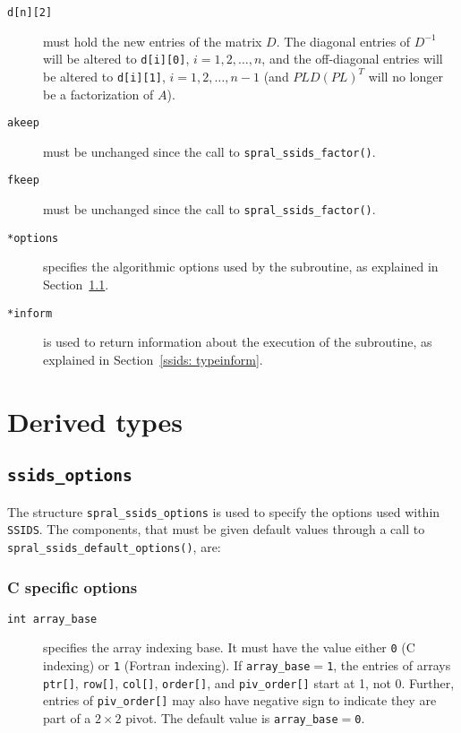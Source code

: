 \begin{description}

\item[\texttt{d[n][2]}] must hold the new entries of the matrix $D$.
   The diagonal entries of ${D}^{-1}$ will be altered to
   {\tt d[i][0]}, $i = 1,2,\ldots,n$, and the off-diagonal entries will be
   altered to {\tt d[i][1]}, $i = 1,2,\ldots,n-1$ (and $PLD(PL)^T$ will no
   longer be a factorization of $A$).

\item[\texttt{akeep}] must be unchanged since the call to
   {\tt spral\_ssids\_factor()}.

\item[\texttt{fkeep}] must be unchanged since the call to
   {\tt spral\_ssids\_factor()}.

\item[\texttt{*options}] specifies the algorithmic options used by the
   subroutine, as explained in Section~\ref{ssids: typeoptions}.

\item[\texttt{*inform}] is used to return information about the execution
   of the subroutine, as explained in Section~\ref{ssids: typeinform}.

\end{description}


\section{Derived types}
\subsection{\texttt{ssids\_options}}
\label{ssids: typeoptions}

The structure {\tt spral\_ssids\_options} is used to specify the options used
within \texttt{SSIDS}. The components, that must be given default values through
a call to \texttt{spral\_ssids\_default\_options()}, are: \\


\subsubsection*{C specific options}
\begin{description}
\item[\texttt{int array\_base}] specifies the array indexing base. It must
   have the value either \texttt{0} (C indexing) or \texttt{1} (Fortran
   indexing). If \texttt{array\_base}$=$\texttt{1}, the entries of arrays
   \texttt{ptr[]}, \texttt{row[]}, \texttt{col[]}, \texttt{order[]}, and
   \texttt{piv\_order[]} start at 1, not 0. Further, entries of
   \texttt{piv\_order[]} may also have negative sign to indicate they are
   part of a $2\times2$ pivot.
   The default value is \texttt{array\_base}$=$\texttt{0}.
\end{description}

